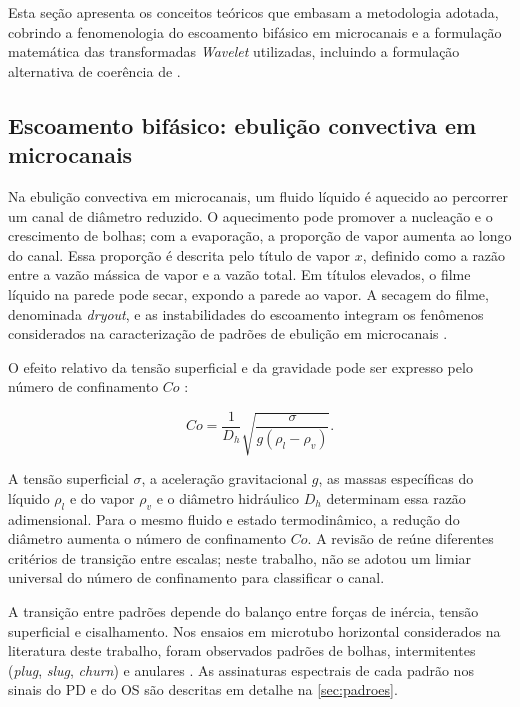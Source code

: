 Esta seção apresenta os conceitos teóricos que embasam a metodologia adotada, cobrindo
a fenomenologia do escoamento bifásico em microcanais e a formulação matemática das
transformadas \textit{Wavelet} utilizadas, incluindo a formulação alternativa de coerência
de .

\subsection{Escoamento bifásico: ebulição convectiva em microcanais}\label{sec:ebolicao}

Na ebulição convectiva em microcanais, um fluido líquido é aquecido ao percorrer um canal
de diâmetro reduzido. O aquecimento pode promover a nucleação e o crescimento de
bolhas; com a evaporação, a proporção de vapor aumenta ao longo do canal. Essa proporção é
descrita pelo título de vapor $x$, definido como a razão entre a vazão mássica de vapor e
a vazão total. Em títulos elevados, o filme líquido na parede pode secar, expondo a
parede ao vapor. A secagem do filme, denominada \textit{dryout}, e as instabilidades
do escoamento integram os fenômenos considerados na caracterização de padrões de
ebulição em microcanais \cite{cheng2023}.

O efeito relativo da tensão superficial e da gravidade pode ser expresso pelo
número de confinamento $Co$ \cite{cheng2023}:

\begin{equation}\label{eq:confinamento}
  Co=\frac{1}{D_h}\sqrt{\frac{\sigma}{g(\rho_l-\rho_v)}}.
\end{equation}

\noindent
A tensão superficial $\sigma$, a aceleração gravitacional $g$, as massas
específicas do líquido $\rho_l$ e do vapor $\rho_v$ e o diâmetro hidráulico $D_h$
determinam essa razão adimensional. Para o mesmo fluido e estado termodinâmico,
a redução do diâmetro aumenta o número de confinamento $Co$. A revisão de
 reúne diferentes critérios de transição entre escalas;
neste trabalho, não se adotou um limiar universal do número de confinamento
para classificar o canal.



A transição entre padrões depende do balanço entre forças de inércia, tensão superficial
e cisalhamento. Nos ensaios em microtubo horizontal considerados na literatura deste
trabalho, foram observados padrões de bolhas, intermitentes
(\textit{plug}, \textit{slug}, \textit{churn}) e anulares
\cite{deoliveira2021,cheng2023}. As assinaturas espectrais de cada padrão nos
sinais do PD e do OS são descritas em detalhe na \autoref{sec:padroes}.

